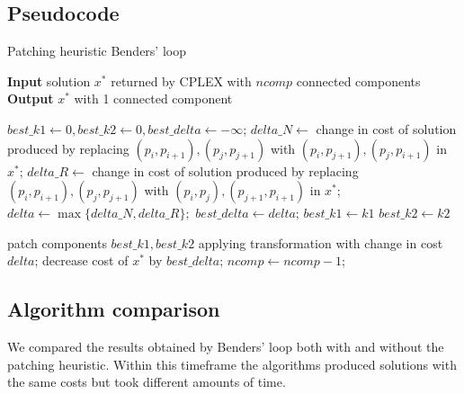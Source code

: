 \subsection{Pseudocode}
\begin{algorithm}[h]
    \caption{Patching heuristic Benders' loop}
    \hspace*{\algorithmicindent} \textbf{Input} solution $x^*$ returned by CPLEX with $ncomp$ connected components\\
    \hspace*{\algorithmicindent} \textbf{Output} $x^*$ with 1 connected component\\
    \begin{algorithmic}

        \State $best\_k1\gets0, best\_k2\gets0, best\_delta\gets-\infty$;
        \State $delta\_N\gets$ change in cost of solution produced by replacing
        \State $(p_i,p_{i+1}), (p_j,p_{j+1})$ with $(p_i,p_{j+1}), (p_j,p_{i+1})$ in $x^*$;
        \State $delta\_R\gets$ change in cost of solution produced by replacing
        \State $(p_i,p_{i+1}), (p_j,p_{j+1})$ with $(p_i,p_j), (p_{j+1},p_{i+1})$ in $x^*$;
        \State $delta\gets\max\{delta\_N,delta\_R\};$
        \State $best\_delta \gets delta$;
        \State $best\_k1\gets k1$
        \State $best\_k2\gets k2$
        \EndIf
        \EndFor
        \EndFor

        \State patch components $best\_k1,best\_k2$ applying transformation with change in cost
        \State $delta$;
        \State decrease cost of $x^*$ by $best\_delta$;
        \State $ncomp \gets ncomp-1$;
        \EndWhile
    \end{algorithmic}
    
\end{algorithm}

\subsection{Algorithm comparison}

We compared the results obtained by Benders' loop both with and without the patching heuristic. Within this timeframe the algorithms produced solutions with the same costs but took different amounts of time.

